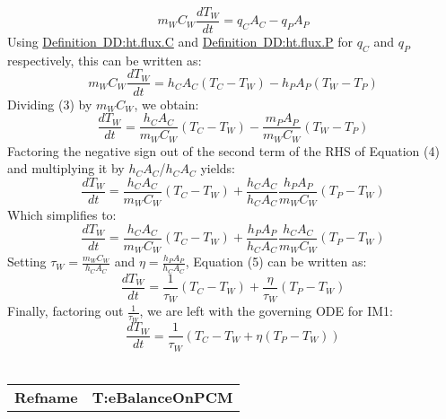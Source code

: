 \documentclass[12pt]{article}
\begin{document}
\begin{dmath}
{m_{W}} {C_{W}} \frac{d {T_{W}}}{d t}={q_{C}} {A_{C}}-{q_{P}} {A_{P}}
\end{dmath}
Using \hyperref[DD:ht.flux.C]{Definition~DD:ht.flux.C} and \hyperref[DD:ht.flux.P]{Definition~DD:ht.flux.P} for ${q_{C}}$ and ${q_{P}}$ respectively, this can be written as:
\begin{dmath}
{m_{W}} {C_{W}} \frac{d {T_{W}}}{d t}={h_{C}} {A_{C}} \left({T_{C}}-{T_{W}}\right)-{h_{P}} {A_{P}} \left({T_{W}}-{T_{P}}\right)
\end{dmath}
Dividing (3) by ${m_{W}}$${C_{W}}$, we obtain:
\begin{dmath}
\frac{d {T_{W}}}{d t}=\frac{{h_{C}} {A_{C}}}{{m_{W}} {C_{W}}} \left({T_{C}}-{T_{W}}\right)-\frac{{m_{P}} {A_{P}}}{{m_{W}} {C_{W}}} \left({T_{W}}-{T_{P}}\right)
\end{dmath}
Factoring the negative sign out of the second term of the RHS of Equation (4) and multiplying it by ${h_{C}}$${A_{C}}$/${h_{C}}$${A_{C}}$ yields:
\begin{dmath}
\frac{d {T_{W}}}{d t}=\frac{{h_{C}} {A_{C}}}{{m_{W}} {C_{W}}} \left({T_{C}}-{T_{W}}\right)+\frac{{h_{C}} {A_{C}}}{{h_{C}} {A_{C}}} \frac{{h_{P}} {A_{P}}}{{m_{W}} {C_{W}}} \left({T_{P}}-{T_{W}}\right)
\end{dmath}
Which simplifies to:
\begin{dmath}
\frac{d {T_{W}}}{d t}=\frac{{h_{C}} {A_{C}}}{{m_{W}} {C_{W}}} \left({T_{C}}-{T_{W}}\right)+\frac{{h_{P}} {A_{P}}}{{h_{C}} {A_{C}}} \frac{{h_{C}} {A_{C}}}{{m_{W}} {C_{W}}} \left({T_{P}}-{T_{W}}\right)
\end{dmath}
Setting ${\tau{}_{W}}=\frac{{m_{W}} {C_{W}}}{{h_{C}} {A_{C}}}$ and $\eta{}=\frac{{h_{P}} {A_{P}}}{{h_{C}} {A_{C}}}$, Equation (5) can be written as:
\begin{dmath}
\frac{d {T_{W}}}{d t}=\frac{1}{{\tau{}_{W}}} \left({T_{C}}-{T_{W}}\right)+\frac{\eta{}}{{\tau{}_{W}}} \left({T_{P}}-{T_{W}}\right)
\end{dmath}
Finally, factoring out $\frac{1}{{\tau{}_{W}}}$, we are left with the governing ODE for IM1:
\begin{dmath}
\frac{d {T_{W}}}{d t}=\frac{1}{{\tau{}_{W}}} \left({T_{C}}-{T_{W}}+\eta{} \left({T_{P}}-{T_{W}}\right)\right)
\end{dmath}
~\newline
\noindent \begin{minipage}{\textwidth}
\begin{tabular}{p{} p{}}
\toprule \textbf{Refname} & \textbf{T:eBalanceOnPCM}

\end{tabular}
\end{minipage}$$
\end{document}
